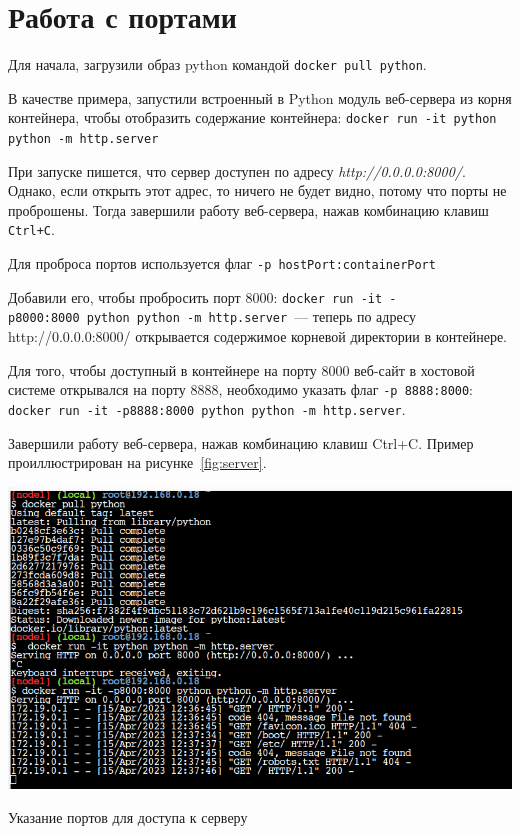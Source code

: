 \section{Работа с портами}
Для начала, загрузили образ python командой \texttt{docker pull python}.\par
В качестве примера, запустили встроенный в Python модуль веб-сервера
из корня контейнера, чтобы отобразить содержание контейнера:
\texttt{docker run -it python python -m http.server}\par
При запуске пишется, что сервер доступен по адресу
\textit{http://0.0.0.0:8000/}. Однако, если открыть этот адрес,
то ничего не будет видно, потому что порты не проброшены.
Тогда завершили работу веб-сервера, нажав комбинацию клавиш
\texttt{Ctrl+C}.\par
Для проброса портов используется флаг \texttt{-p~hostPort:containerPort}\par
Добавили его, чтобы пробросить порт 8000:
\texttt{docker~run~-it~-p8000:8000~python~python~-m~http.server}~--- теперь
по адресу http://0.0.0.0:8000/ открывается содержимое корневой директории
в контейнере.\par
Для того, чтобы доступный в контейнере на порту 8000 веб-сайт
в хостовой системе открывался на порту 8888, необходимо указать флаг
\texttt{-p~8888:8000}:
\texttt{docker~run~-it~-p8888:8000~python~python~-m~http.server}.\par
Завершили работу веб-сервера, нажав комбинацию клавиш Ctrl+C.
Пример проиллюстрирован на рисунке~\ref{fig:server}.

\begin{image}
	\includegraphics[width=1\textwidth]{Screenshot from 2023-04-15 15-38-00}
	\caption{Указание портов для доступа к серверу}
	\label{fig:server}
\end{image}

